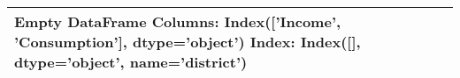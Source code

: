 \begin{tabular}{lrr}
\toprule
Empty DataFrame
Columns: Index(['Income', 'Consumption'], dtype='object')
Index: Index([], dtype='object', name='district') \\
\bottomrule
\end{tabular}
